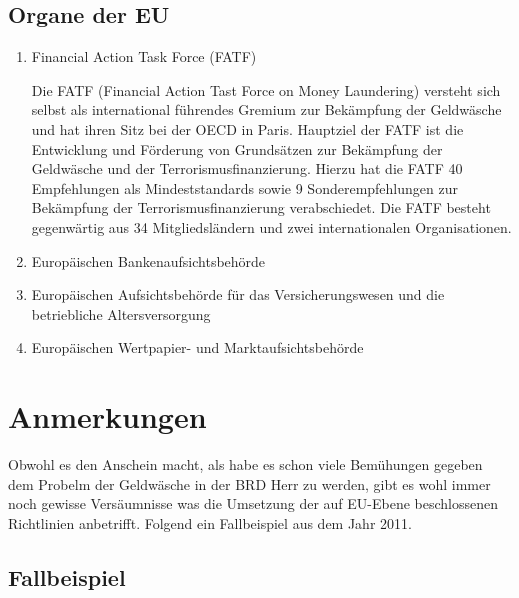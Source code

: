 \documentclass{article}
\begin{document}
        \subsection[Organe EU]{Organe der EU}

            \begin{enumerate}

                \item Financial Action Task Force (FATF)

                    Die FATF (Financial Action Tast Force on Money Laundering) versteht sich selbst als international führendes Gremium zur Bekämpfung der Geldwäsche und hat ihren
                    Sitz bei der OECD in Paris. Hauptziel der FATF ist die Entwicklung und Förderung von Grundsätzen zur Bekämpfung der Geldwäsche und der Terrorismusfinanzierung. Hierzu hat die FATF 40 Empfehlungen als Mindeststandards sowie 9 Sonderempfehlungen zur Bekämpfung der Terrorismusfinanzierung verabschiedet. Die FATF besteht gegenwärtig aus 34 Mitgliedsländern und zwei internationalen Organisationen.

                \item Europäischen Bankenaufsichtsbehörde 

                \item Europäischen Aufsichtsbehörde für das Versicherungswesen und die betriebliche Altersversorgung 

                \item Europäischen Wertpapier- und Marktaufsichtsbehörde 

            \end{enumerate}        

\newpage

    \section[Anmerkungen]{Anmerkungen}

        Obwohl es den Anschein macht, als habe es schon viele Bemühungen gegeben dem Probelm der Geldwäsche in der BRD Herr zu werden, gibt es wohl immer noch gewisse Versäumnisse was die Umsetzung der auf EU-Ebene beschlossenen Richtlinien anbetrifft. Folgend ein Fallbeispiel aus dem Jahr 2011.

        \subsection[Fallbeispiel]{Fallbeispiel}
\end{document}
